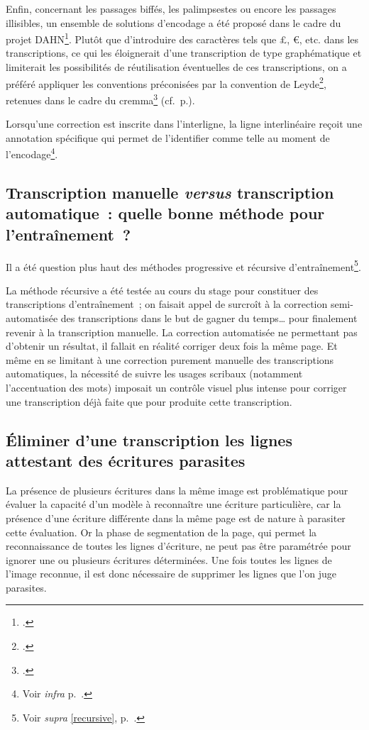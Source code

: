 \documentclass[a4paper,12pt,twoside]{book}
\begin{document}
				Enfin, concernant les passages biffés, les palimpsestes ou encore les passages illisibles, un ensemble de solutions d'encodage a été proposé dans le cadre du projet DAHN\footcite{chiffoleauFewTipsReading}. Plutôt que d'introduire des caractères tels que £, €, etc. dans les transcriptions, ce qui les éloignerait d'une transcription de type graphématique et limiterait les possibilités de réutilisation éventuelles de ces transcriptions, on a préféré appliquer les conventions préconisées par la convention de Leyde\footcite{leidenConvention}, retenues dans le cadre du \gls{cremma}\footcite{pincheSeminaireCreationModele2021a} (cf.~p.\pageref{biffes}).
				
				Lorsqu'une correction est inscrite dans l'interligne, la ligne interlinéaire reçoit une annotation spécifique qui permet de l'identifier comme telle au moment de l'encodage\footnote{Voir \textit{infra} p.~\pageref{interlinear}.}.
								
			\subsection[Transcription manuelle \textit{versus} transcription automatique]{Transcription manuelle \textit{versus} transcription automatique~: quelle bonne méthode pour l'entraînement~?}
				\label{progressive}
				Il a été question plus haut des méthodes progressive et récursive d'entraînement\footnote{Voir \textit{supra} \ref{recursive}, p.~\pageref{recursive}.}.
				
				La méthode récursive a été testée au cours du stage pour constituer des transcriptions d'entraînement~; on faisait appel de surcroît à la correction semi-automatisée des transcriptions dans le but de gagner du temps… pour finalement revenir à la transcription manuelle. La correction automatisée ne permettant pas d'obtenir un résultat, il fallait en réalité corriger deux fois la même page. Et même en se limitant à une correction purement manuelle des transcriptions automatiques, la nécessité de suivre les usages scribaux (notamment l'accentuation des mots) imposait un contrôle visuel plus intense pour corriger une transcription déjà faite que pour produite cette transcription.
			
			\subsection{Éliminer d'une transcription les lignes attestant des écritures parasites}
				La présence de plusieurs écritures dans la même image est problématique pour évaluer la capacité d'un modèle à reconnaître une écriture particulière, car la présence d'une écriture différente dans la même page est de nature à parasiter cette évaluation. Or la phase de \gls{segmentation} de la page, qui permet la reconnaissance de toutes les lignes d'écriture, ne peut pas être paramétrée pour ignorer une ou plusieurs écritures déterminées. Une fois toutes les lignes de l'image reconnue, il est donc nécessaire de supprimer les lignes que l'on juge parasites.
				
\end{document}
